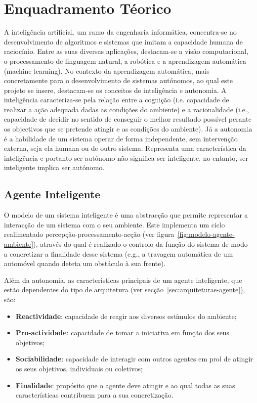 \chapter{Enquadramento Téorico}\label{ch:enquadramento-teorico}

A inteligência artificial, um ramo da engenharia informática, concentra-se no desenvolvimento de algoritmos e sistemas que imitam a capacidade humana de raciocínio.
Entre as suas diversas aplicações, destacam-se a visão computacional, o processamento de linguagem natural, a robótica e a aprendizagem automática (machine learning).
No contexto da aprendizagem automática, mais concretamente para o desenvolvimento de sistemas autónomos, ao qual este projeto se insere, destacam-se os conceitos de inteligência e autonomia.
A inteligência caracteriza-se pela relação entre a cognição (i.e. capacidade de realizar a ação adequada dadas as condições do ambiente) e a racionalidade (i.e., capacidade de decidir no sentido de conseguir o melhor resultado possível perante os objectivos que se pretende atingir e as condições do ambiente).
Já a autonomia é a habilidade de um sistema operar de forma independente, sem intervenção externa, seja ela humana ou de outro sistema.
Representa uma característica da inteligência e portanto ser autónomo não significa ser inteligente, no entanto, ser inteligente implica ser autónomo.


\section{Agente Inteligente}\label{sec:agente-inteligente}
O modelo de um sistema inteligente é uma abstracção que permite representar a interacção de um sistema com o seu ambiente.
Este implementa um ciclo realimentado percepção-processamento-acção (ver figura~\ref{fig:modelo-agente-ambiente}), através do qual é realizado o controlo da função do sistema de modo a concretizar a finalidade desse sistema (e.g., a travagem automática de um automóvel quando deteta um obstáculo à sua frente).

Além da autonomia, as caracteristicas principais de um agente inteligente, que estão dependentes do tipo de arquitetura (ver secção~\ref{sec:arquiteturas-agente}), são:

\begin{itemize}
    \item \textbf{Reactividade}: capacidade de reagir aos diversos estímulos do ambiente;
    \item \textbf{Pro-actividade}: capacidade de tomar a iniciativa em função dos seus objetivos;
    \item \textbf{Sociabilidade}: capacidade de interagir com outros agentes em prol de atingir os seus objetivos, individuais ou coletivos;
    \item \textbf{Finalidade}: propósito que o agente deve atingir e ao qual todas as suas características contribuem para a sua concretização.
\end{itemize}

